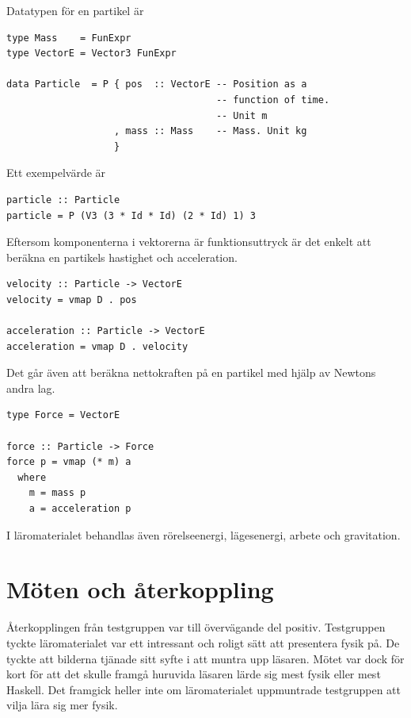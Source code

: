 Datatypen för en partikel är

\begin{lstlisting}
type Mass    = FunExpr
type VectorE = Vector3 FunExpr

data Particle  = P { pos  :: VectorE -- Position as a
                                     -- function of time.
                                     -- Unit m
                   , mass :: Mass    -- Mass. Unit kg
                   }
\end{lstlisting}

Ett exempelvärde är

\begin{lstlisting}
particle :: Particle
particle = P (V3 (3 * Id * Id) (2 * Id) 1) 3
\end{lstlisting}

Eftersom komponenterna i vektorerna är funktionsuttryck är det enkelt att beräkna en partikels hastighet och acceleration.

\begin{lstlisting}
velocity :: Particle -> VectorE
velocity = vmap D . pos

acceleration :: Particle -> VectorE
acceleration = vmap D . velocity
\end{lstlisting}

Det går även att beräkna nettokraften på en partikel med hjälp av Newtons andra lag.

\begin{lstlisting}
type Force = VectorE

force :: Particle -> Force
force p = vmap (* m) a
  where
    m = mass p
    a = acceleration p
\end{lstlisting}

I läromaterialet behandlas även rörelseenergi, lägesenergi, arbete och gravitation.

\section{Möten och återkoppling}\label{sec:res_test}

Återkopplingen från testgruppen var till övervägande del positiv.
Testgruppen tyckte läromaterialet var ett intressant och roligt sätt att
presentera fysik på. De tyckte att bilderna tjänade sitt syfte i att muntra upp
läsaren. Mötet var dock för kort för att det skulle framgå huruvida läsaren lärde
sig mest fysik eller mest Haskell. Det framgick heller inte om läromaterialet
uppmuntrade testgruppen att vilja lära sig mer fysik.

